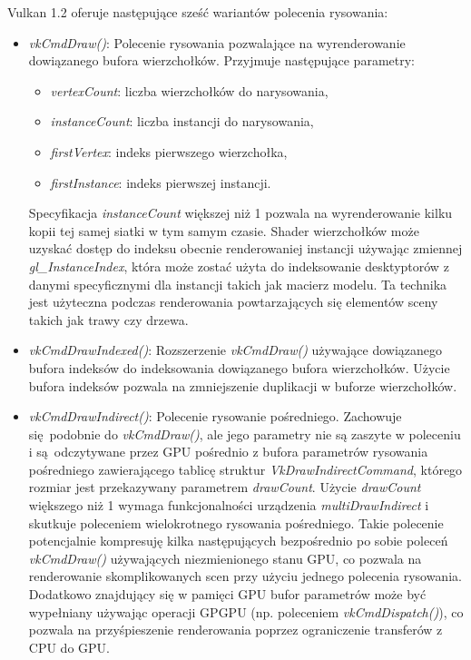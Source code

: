 Vulkan 1.2 oferuje następujące sześć wariantów polecenia rysowania:
\begin{itemize}
	\item \textit{vkCmdDraw()}:
	Polecenie rysowania pozwalające na wyrenderowanie dowiązanego bufora wierzchołków.
	Przyjmuje następujące parametry:
	\begin{itemize}
		\item \textit{vertexCount}: liczba wierzchołków do narysowania,
		\item \textit{instanceCount}: liczba instancji do narysowania,
		\item \textit{firstVertex}: indeks pierwszego wierzchołka,
		\item \textit{firstInstance}: indeks pierwszej instancji.
	\end{itemize}
	Specyfikacja \textit{instanceCount} większej niż 1 pozwala na wyrenderowanie kilku kopii tej samej siatki w tym samym czasie. Shader wierzchołków może uzyskać dostęp do indeksu obecnie renderowaniej instancji używając zmiennej \textit{gl\_InstanceIndex}, która może zostać użyta do indeksowanie desktyptorów z danymi specyficznymi dla instancji takich jak macierz modelu.
	Ta technika jest użyteczna podczas renderowania powtarzających się elementów sceny takich jak trawy czy drzewa. 

	\item \textit{vkCmdDrawIndexed()}: Rozszerzenie \textit{vkCmdDraw()} używające dowiązanego bufora indeksów do indeksowania dowiązanego bufora wierzchołków.
	Użycie bufora indeksów pozwala na zmniejszenie duplikacji w buforze wierzchołków.
	
	\item \textit{vkCmdDrawIndirect()}: Polecenie rysowanie pośredniego.
	Zachowuje się podobnie do \textit{vkCmdDraw()}, ale jego parametry nie są zaszyte w poleceniu i są odczytywane przez GPU pośrednio z bufora parametrów rysowania pośredniego zawierającego tablicę struktur \textit{VkDrawIndirectCommand}, którego rozmiar jest przekazywany parametrem \textit{drawCount}.
	Użycie \textit{drawCount} większego niż 1 wymaga funkcjonalności urządzenia \textit{multiDrawIndirect} i skutkuje poleceniem wielokrotnego rysowania pośredniego.
	Takie polecenie potencjalnie kompresuję kilka następujących bezpośrednio po sobie poleceń \textit{vkCmdDraw()} używających niezmienionego stanu GPU, co pozwala na renderowanie skomplikowanych scen przy użyciu jednego polecenia rysowania.
	Dodatkowo znajdujący się w pamięci GPU bufor parametrów może być wypełniany używając operacji GPGPU (np. poleceniem \textit{vkCmdDispatch()}), co pozwala na przyśpieszenie renderowania poprzez ograniczenie transferów z CPU do GPU.
	

\end{itemize}

